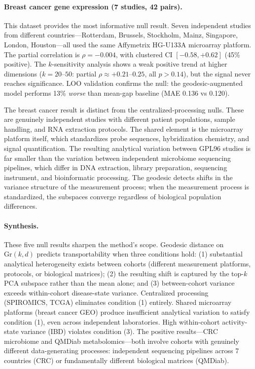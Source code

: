 \documentclass[11pt]{article}
\begin{document}
\paragraph{Breast cancer gene expression (7 studies, 42 pairs).} This dataset provides the most informative null result. Seven independent studies from different countries---Rotterdam, Brussels, Stockholm, Mainz, Singapore, London, Houston---all used the same Affymetrix HG-U133A microarray platform. The partial correlation is $\rho = -0.004$, with clustered CI $[-0.58, +0.62]$ (45\% positive). The $k$-sensitivity analysis shows a weak positive trend at higher dimensions ($k = 20$--$50$: partial $\rho \approx +0.21$--$0.25$, all $p > 0.14$), but the signal never reaches significance. LOO validation confirms the null: the geodesic-augmented model performs 13\% \emph{worse} than mean-gap baseline (MAE 0.136 vs 0.120).

The breast cancer result is distinct from the centralized-processing nulls. These are genuinely independent studies with different patient populations, sample handling, and RNA extraction protocols. The shared element is the microarray platform itself, which standardizes probe sequences, hybridization chemistry, and signal quantification. The resulting analytical variation between GPL96 studies is far smaller than the variation between independent microbiome sequencing pipelines, which differ in DNA extraction, library preparation, sequencing instrument, and bioinformatic processing. The geodesic detects shifts in the variance structure of the measurement process; when the measurement process is standardized, the subspaces converge regardless of biological population differences.

\paragraph{Synthesis.} These five null results sharpen the method's scope. Geodesic distance on $\mathrm{Gr}(k,d)$ predicts transportability when three conditions hold: (1) substantial analytical heterogeneity exists between cohorts (different measurement platforms, protocols, or biological matrices); (2) the resulting shift is captured by the top-$k$ PCA subspace rather than the mean alone; and (3) between-cohort variance exceeds within-cohort disease-state variance. Centralized processing (SPIROMICS, TCGA) eliminates condition (1) entirely. Shared microarray platforms (breast cancer GEO) produce insufficient analytical variation to satisfy condition (1), even across independent laboratories. High within-cohort activity-state variance (IBD) violates condition (3). The positive results---CRC microbiome and QMDiab metabolomics---both involve cohorts with genuinely different data-generating processes: independent sequencing pipelines across 7 countries (CRC) or fundamentally different biological matrices (QMDiab).
\end{document}
